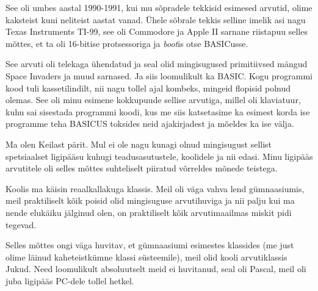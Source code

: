 See oli umbes aastal 1990-1991, kui mu sõpradele tekkisid esimesed arvutid, 
olime kaksteist kuni neliteist aastat vanad. Ühele sõbrale tekkis selline 
imelik asi nagu Texas Instruments TI-99, see oli Commodore ja Apple 
II sarnane riistapuu selles mõttes, et ta oli 16-bitise protsessoriga ja 
\emph{boot}is otse BASICusse. 

See arvuti oli telekaga ühendatud ja seal olid mingisugused primitiivsed mängud 
Space Invaders ja muud sarnased. Ja siis 
loomulikult ka BASIC. Kogu programmi kood tuli kassetilindilt, nii nagu tollel 
ajal kombeks, mingeid flopisid polnud olemas. See oli minu esimene kokkupuude 
sellise arvutiga, millel oli klaviatuur, kuhu sai sisestada programmi koodi, 
kus me siis katsetasime ka esimest korda ise programme teha BASICUS toksides 
neid ajakirjadest ja mõeldes ka ise välja. 


Ma olen Keilast pärit. Mul ei ole nagu kunagi olnud mingisugust 
sellist spetsiaalset ligipääsu kuhugi  teadusasutustele, koolidele ja nii 
edasi. Minu ligipääs arvutitele oli selles mõttes suhteliselt  piiratud 
võrreldes mõnede teistega.


Koolis ma käisin reaalkallakuga klassis. Meil oli väga vahva lend 
gümnaasiumis, meil praktiliselt kõik poisid olid 
mingisuguse arvutihuviga ja nii palju kui ma nende elukäiku jälginud olen, on 
praktiliselt kõik  arvutimaailmas miskit pidi tegevad.


Selles mõttes ongi väga huvitav, et gümnaasiumi esimestes klassides (me just 
olime läinud kaheteistkümne klassi süsteemile), meil olid kooli arvutiklassis  
Jukud. Need loomulikult absoluutselt meid ei huvitanud, 
seal oli Pascal, meil oli juba ligipääs PC-dele tollel 
hetkel. 

